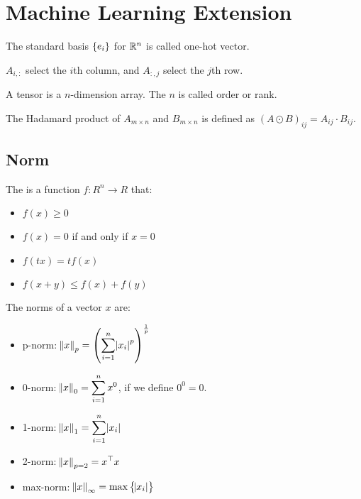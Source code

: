 \chapter{Machine Learning Extension}


The standard basis $\set{e_i}$ for $\mathbb{R}^n$ is called one-hot vector.

$A_{i,:}$ select the $i$th column, and $A_{:,j}$ select the $j$th row.

A tensor is a $n$-dimension array. The $n$ is called order or rank.


\begin{definition}
    The Hadamard product of $A_{m \times n}$ and $B_{m\times n}$ is defined as $(A \odot B)_{ij} = A_{ij} \cdot B_{ij}$.
\end{definition}

\section{Norm}

\begin{definition}[Norm]
    The  is a function $f : R^n \rightarrow R$ that:
    \begin{itemize}
        \item $f(x) \geq 0$
        \item $f(x) = 0$ if and only if $x = 0$
        \item $f(tx) = t f(x)$
        \item $f(x+y) \leq f(x) + f(y)$
    \end{itemize}
\end{definition}

\begin{definition}
    The norms of a vector $x$ are:
\begin{itemize}
    \item p-norm: $\displaystyle \norm{x}_p = \left(\sum_{i=1}^n \abs{x_i}^p \right)^{\frac{1}{p}}$
    \item 0-norm: $\displaystyle \norm{x}_0 = \sum_{i=1}^n x^0$, if we define $0^0 = 0$.
    \item 1-norm: $\displaystyle \norm{x}_1 = \sum_{i=1}^n \abs{x_i}$
    \item 2-norm: $\displaystyle \norm{x}_{p=2} = {x}^\top x$
    \item max-norm: $\norm{x}_\infty = \max \set{\abs{x_i}}$
\end{itemize}
\end{definition}

